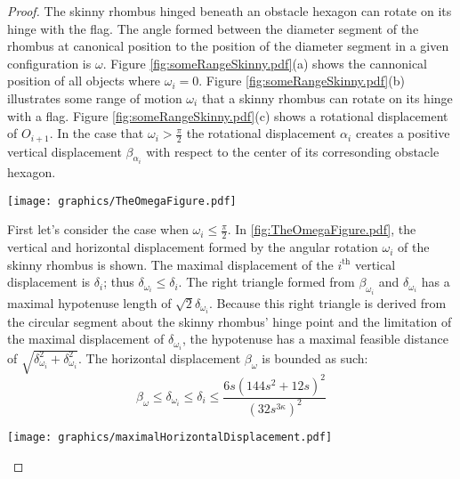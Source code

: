 \documentclass[10pt]{CSUNthesis}
\theoremstyle{plain}%
\theoremstyle{definition}
\theoremstyle{remark}
\newcommand{\ith}{i^\text{th}}
\newcommand{\lr}[1]{\left( #1 \right)}
\begin{document}
\begin{proof}
The skinny rhombus hinged beneath an obstacle hexagon can rotate on its hinge with the flag. 
The angle formed between the diameter segment of the rhombus at canonical position to the position of the diameter segment in a given configuration is $\omega$.
Figure \ref{fig:someRangeSkinny.pdf}(a) shows the cannonical position of all objects where $\omega_i=0$.
Figure \ref{fig:someRangeSkinny.pdf}(b) illustrates some range of motion $\omega_i$ that a skinny rhombus can rotate on its hinge with a flag.  
Figure \ref{fig:someRangeSkinny.pdf}(c) shows a rotational displacement of $O_{i+1}$.  
In the case that $\omega_i > \frac{\pi}{2}$ the rotational displacement $\alpha_i$ creates a positive vertical displacement $\beta_
{\alpha_i}$ with respect to the center of its corresonding obstacle hexagon.

\begin{minipage}{\linewidth}
\begin{center}
\texttt{[image: graphics/TheOmegaFigure.pdf]}
\label{fig:TheOmegaFigure.pdf}
\end{center}
\end{minipage}

First let's consider the case when $\omega_i \leq \frac{\pi}{2}$.
In \ref{fig:TheOmegaFigure.pdf}, the vertical and horizontal displacement formed by the angular rotation $\omega_i$ of the skinny rhombus is shown. 
The maximal displacement of the $\ith$ vertical displacement is $\delta_i$; thus $\delta_{\omega_i} \leq \delta_i$.  
The right triangle formed from $\beta_{\omega_i}$ and $\delta_{\omega_i}$ has a maximal hypotenuse length of $\sqrt{2}\delta_{\omega_i}$.  
Because this right triangle is derived from the circular segment about the skinny rhombus' hinge point and the limitation of the maximal displacement of $\delta_{\omega_i}$, the hypotenuse has a maximal feasible distance of $\sqrt{\delta_{\omega_i}^2 + \delta_{\omega_i}^2}$.
The horizontal displacement $\beta_\omega$ is bounded as such:
\begin{equation}\label{eqn:betaOmegaBound}
\beta_\omega \leq \delta_{\omega_i} \leq \delta_i \leq \frac{6s\lr{144s^2+12s}^2}{\lr{32s^{3\kappa}}^2}
\end{equation}

\begin{minipage}{\linewidth}
\begin{center}
\texttt{[image: graphics/maximalHorizontalDisplacement.pdf]}
\label{fig:maximalHorizontalDisplacement.pdf}
\end{center}
\end{minipage}


\end{proof}
\end{document}
